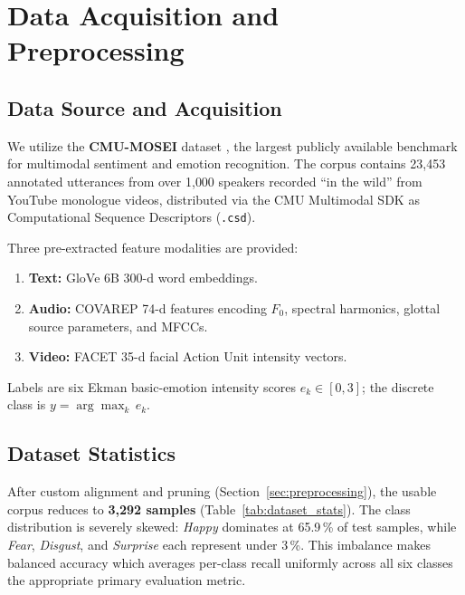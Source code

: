 \documentclass[conference]{IEEEtran}
\begin{document}
\section{Data Acquisition and Preprocessing}

\subsection{Data Source and Acquisition}
We utilize the \textbf{CMU-MOSEI} dataset \cite{zadeh2018mosei}, the largest
publicly available benchmark for multimodal sentiment and emotion recognition.
The corpus contains 23{,}453 annotated utterances from over 1{,}000 speakers
recorded ``in the wild'' from YouTube monologue videos, distributed via the
CMU Multimodal SDK as Computational Sequence Descriptors (\texttt{.csd}).

Three pre-extracted feature modalities are provided:
\begin{enumerate}
    \item \textbf{Text:} GloVe 6B 300-d word embeddings.
    \item \textbf{Audio:} COVAREP 74-d features encoding $F_0$, spectral
    harmonics, glottal source parameters, and MFCCs.
    \item \textbf{Video:} FACET 35-d facial Action Unit intensity vectors.
\end{enumerate}

Labels are six Ekman basic-emotion intensity scores $e_k \in [0,3]$; the
discrete class is $y = \arg\max_k\,e_k$.

\subsection{Dataset Statistics}
After custom alignment and pruning (Section~\ref{sec:preprocessing}), the
usable corpus reduces to \textbf{3{,}292 samples}
(Table~\ref{tab:dataset_stats}).  The class distribution is severely skewed:
\emph{Happy} dominates at 65.9\,\% of test samples, while \emph{Fear},
\emph{Disgust}, and \emph{Surprise} each represent under 3\,\%.  This
imbalance makes balanced accuracy which averages per-class recall uniformly
across all six classes the appropriate primary evaluation metric.
\end{document}

